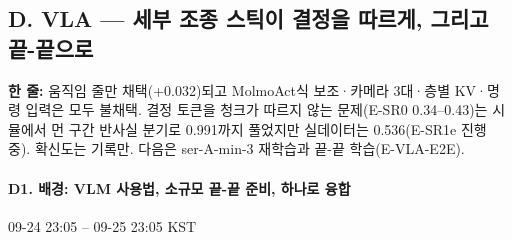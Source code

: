 \subsection{D. VLA --- 세부 조종 스틱이 결정을 따르게, 그리고 끝-끝으로}\label{rec:D}
\noindent\textbf{한 줄:} 움직임 줄만 채택(+0.032)되고 MolmoAct식 보조·카메라 3대·층별 KV·명령 입력은 모두 불채택. 결정 토큰을 청크가 따르지 않는 문제(E-SR0 0.34--0.43)는 시뮬에서 먼 구간 반사실 분기로 0.991까지 풀었지만 실데이터는 0.536(E-SR1e 진행 중). 확신도는 기록만. 다음은 ser-A-min-3 재학습과 끝-끝 학습(E-VLA-E2E).

\paragraph{D1. 배경: VLM 사용법, 소규모 끝-끝 준비, 하나로 융합}
{\small 09-24 23:05 -- 09-25 23:05 KST}
